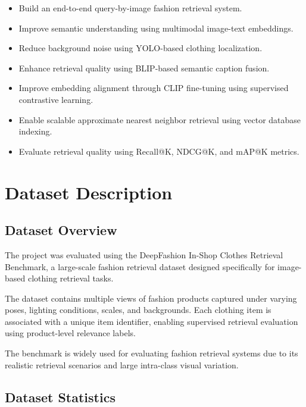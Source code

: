 \documentclass[11pt,a4paper]{article}
\begin{document}
\begin{itemize}
    \item Build an end-to-end query-by-image fashion retrieval system.
    
    \item Improve semantic understanding using multimodal image-text embeddings.
    
    \item Reduce background noise using YOLO-based clothing localization.
    
    \item Enhance retrieval quality using BLIP-based semantic caption fusion.
    
    \item Improve embedding alignment through CLIP fine-tuning using supervised contrastive learning.
    
    \item Enable scalable approximate nearest neighbor retrieval using vector database indexing.
    
    \item Evaluate retrieval quality using Recall@K, NDCG@K, and mAP@K metrics.
\end{itemize}

\section{Dataset Description}

\subsection{Dataset Overview}

The project was evaluated using the DeepFashion In-Shop Clothes Retrieval Benchmark, a large-scale fashion retrieval dataset designed specifically for image-based clothing retrieval tasks.

The dataset contains multiple views of fashion products captured under varying poses, lighting conditions, scales, and backgrounds. Each clothing item is associated with a unique item identifier, enabling supervised retrieval evaluation using product-level relevance labels.

The benchmark is widely used for evaluating fashion retrieval systems due to its realistic retrieval scenarios and large intra-class visual variation.

\subsection{Dataset Statistics}
\end{document}
